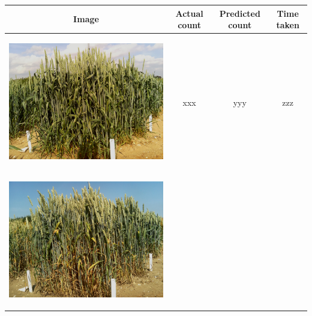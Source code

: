 \begin{table}[h!]
  \centering
  \begin{tabular}{ | c | c | c | c |}
    \hline
    Image & Actual count & Predicted count & Time taken \\ \hline
    \begin{minipage}{.3\textwidth}
      \begin{center}
		\includegraphics[width=\linewidth]{Images/001}
      \end{center}
    \end{minipage}
    &
      xxx
    & 
      yyy
    & 
      zzz
    \\ \hline
    \begin{minipage}{.3\textwidth}
      \begin{center}
		\includegraphics[width=\linewidth]{Images/002}

\end{center}
\end{minipage}
\end{tabular}
\end{table}
